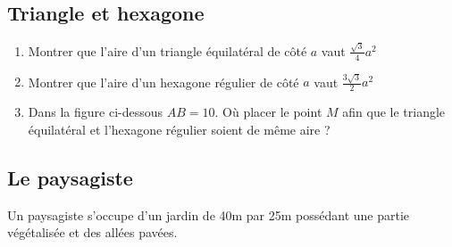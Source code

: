\documentclass[oneside,12pt]{book}          %
\begin{document}
\subsection{Triangle et hexagone}
\begin{enumerate}
    \item Montrer que l'aire d'un triangle équilatéral de côté $a$ vaut $\frac{\sqrt{3}}{4} a^2$
    \item Montrer que l'aire d'un hexagone régulier de côté $a$ vaut $\frac{3 \sqrt{3}}{2} a^2$
    \item Dans la figure ci-dessous $AB=10$. Où placer le point $M$ afin que le triangle équilatéral et l'hexagone régulier soient de même aire ?
\end{enumerate}
\begin{center}
\end{center}



\subsection{Le paysagiste}

Un paysagiste s'occupe d'un jardin de 40m par 25m possédant une partie végétalisée et des allées pavées.
\end{document}
